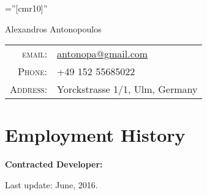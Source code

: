 \documentclass[a4paper,10pt]{article}
\newenvironment{contract_work}
{
    \renewcommand\descriptionlabel[1]{\hspace{\labelsep}{##1,}}

\begin{description}[leftmargin=0cm, labelwidth=0cm, labelsep=0.1cm]
}
{\end{description} }
\begin{document}
\pagestyle{fancyplain}
\renewcommand{\headrulewidth}{0.0pt}
\lhead{}
\chead{}
\rhead{}
\lfoot{}
\cfoot{}
\font\fb=''[cmr10]'' %

\par{\centering
        {\Huge Alexandros Antonopoulos
    }\bigskip\par}

\begin{tabular}{rl}
    \textsc{email:}     & \href{mailto:antonopa@gmail.com}{antonopa@gmail.com} \\
    \textsc{Phone:}     & +49 152 55685022 \\
    \textsc{Address:}   & Yorckstrasse 1/1, Ulm, Germany
\end{tabular}

\section{Employment History}
\begin{description}
  
  
  
  \item \textbf{Contracted Developer:}
  \begin{contract_work}
    
    
  \end{contract_work}
  
\end{description}





%


\vfill \hfill Last update: June, 2016.
\end{document}
